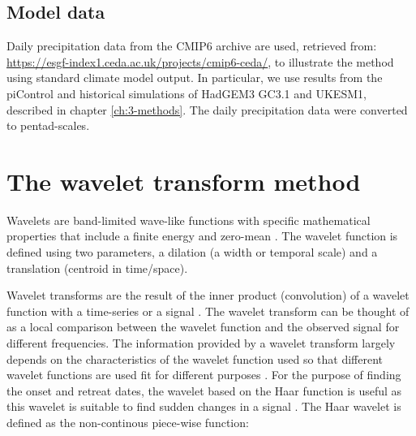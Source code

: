 \subsection{Model data}


Daily precipitation data from the CMIP6 archive are used, retrieved from: \url{https://esgf-index1.ceda.ac.uk/projects/cmip6-ceda/}, to illustrate the method using standard climate model output.
In particular, we use results from the piControl and historical simulations of HadGEM3 GC3.1 and UKESM1, described in chapter \ref{ch:3-methods}.
The daily precipitation data were converted to pentad-scales.


\section{The wavelet transform method}


Wavelets are band-limited wave-like functions with specific mathematical properties that include a finite energy and zero-mean \citep{whitcher2000,addison2017}.
The wavelet function is defined using two parameters, a dilation (a width or temporal scale) and a translation (centroid in time/space).

Wavelet transforms are the result of the inner product (convolution) of a wavelet function with  a time-series or a signal \citep{addison2017}. 
The wavelet transform can be thought of as a local comparison between the wavelet function and the observed signal for different frequencies.
The information provided by a wavelet transform largely depends on the characteristics of the wavelet function used so that different wavelet functions are used fit for different purposes \citep{addison2017}. For the purpose of finding the onset and retreat dates, the wavelet based on the Haar function is useful as this wavelet is suitable to find sudden changes in a signal \citep{addison2017,brooks2003}. The Haar wavelet is defined as the non-continous piece-wise function:

